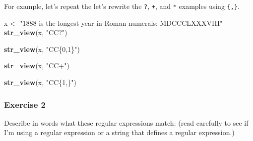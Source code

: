 \documentclass[]{book}
\newenvironment{Shaded}{\begin{snugshade}}{\end{snugshade}}
\newcommand{\KeywordTok}[1]{\textcolor[rgb]{0.13,0.29,0.53}{\textbf{#1}}}
\newcommand{\NormalTok}[1]{#1}
\newcommand{\StringTok}[1]{\textcolor[rgb]{0.31,0.60,0.02}{#1}}
\theoremstyle{plain}
\theoremstyle{remark}
\theoremstyle{definition}
\theoremstyle{definition}
\theoremstyle{definition}
\theoremstyle{remark}
\begin{document}
For example, let's repeat the let's rewrite the \texttt{?}, \texttt{+},
and \texttt{*} examples using \texttt{\{,\}}.

\begin{Shaded}
\begin{Highlighting}[]
\NormalTok{x <-}\StringTok{ "1888 is the longest year in Roman numerals: MDCCCLXXXVIII"}
\KeywordTok{str_view}\NormalTok{(x, }\StringTok{"CC?"}\NormalTok{)}
\end{Highlighting}
\end{Shaded}

\begin{Shaded}
\begin{Highlighting}[]
\KeywordTok{str_view}\NormalTok{(x, }\StringTok{"CC\{0,1\}"}\NormalTok{)}
\end{Highlighting}
\end{Shaded}

\begin{Shaded}
\begin{Highlighting}[]
\KeywordTok{str_view}\NormalTok{(x, }\StringTok{"CC+"}\NormalTok{)}
\end{Highlighting}
\end{Shaded}

\begin{Shaded}
\begin{Highlighting}[]
\KeywordTok{str_view}\NormalTok{(x, }\StringTok{"CC\{1,\}"}\NormalTok{)}
\end{Highlighting}
\end{Shaded}

\hypertarget{exercise-2-33}{%
\subsubsection{Exercise 2}\label{exercise-2-33}}

Describe in words what these regular expressions match: (read carefully
to see if I'm using a regular expression or a string that defines a
regular expression.)
\end{document}
